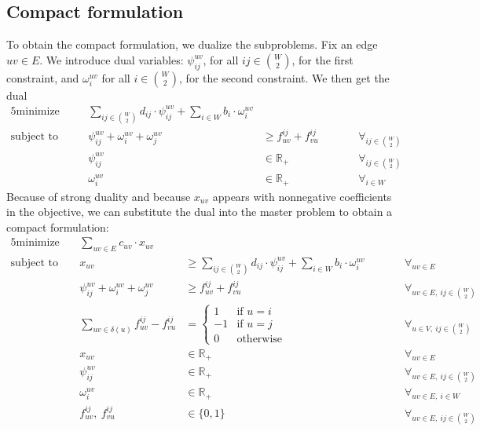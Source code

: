\documentclass[11pt]{article}
\begin{document}
    \subsection{Compact formulation}
    To obtain the compact formulation, we dualize the subproblems.
    Fix an edge $uv \in E$.
    We introduce dual variables: $\psi_{ij}^{uv}$, for all $ij \in \binom W 2$, for the first constraint, and $\omega_i^{uv}$ for all $i \in \binom W 2$, for the second constraint.
    We then get the dual
    \begin{alignat*}{5}
        \text{minimize}\quad && \sum_{ij \in \binom{W}{2}} d_{ij} \cdot \psi_{ij}^{uv} + \sum_{i \in W} b_i \cdot \omega_i^{uv} &&& \\
        \text{subject to}\quad && \psi_{ij}^{uv} + \omega_i^{uv} + \omega_j^{uv} &\ge f_{uv}^{ij} + f_{vu}^{ij} &&\qquad \forall_{ij \in \binom W 2} \\
        && \psi_{ij}^{uv} &\in \mathbb{R}_+ &&\qquad \forall_{ij \in \binom{W}{2}} \\
        && \omega_i^{uv} &\in \mathbb{R}_+ &&\qquad \forall_{i \in W}
    \end{alignat*}
    Because of strong duality and because $x_{uv}$ appears with nonnegative coefficients in the objective, we can substitute the dual into the master problem to obtain a compact formulation:
    \begin{alignat*}{5}
        \text{minimize}\ && \sum_{uv \in E} c_{uv} \cdot x_{uv} &&& \\
        \text{subject to}\ && x_{uv} &\ge \sum_{ij \in \binom{W}{2}} d_{ij} \cdot \psi_{ij}^{uv} + \sum_{i \in W} b_i \cdot \omega_i^{uv} &&\qquad \forall_{uv \in E} \\
        && \psi_{ij}^{uv} + \omega_i^{uv} + \omega_j^{uv} &\ge f_{uv}^{ij} + f_{vu}^{ij} &&\qquad \forall_{uv \in E,\ ij \in \binom W 2} \\
        && \sum_{uv \in \delta(u)} f_{uv}^{ij} - f_{vu}^{ij} &= \begin{cases}
                                     1 & \text{if $u = i$} \\
                                     -1 & \text{if $u = j$} \\
                                     0 & \text{otherwise}
        \end{cases} &&\qquad \forall_{u \in V,\ ij \in \binom{W}{2}} \\
        && x_{uv} &\in \mathbb{R}_+ &&\qquad \forall_{uv \in E} \\
        && \psi_{ij}^{uv} &\in \mathbb{R}_+ &&\qquad \forall_{uv \in E,\ ij \in \binom{W}{2}} \\
        && \omega_i^{uv} &\in \mathbb{R}_+ &&\qquad \forall_{uv \in E,\ i \in W} \\
        && f_{uv}^{ij},\ f_{vu}^{ij} &\in \{ 0, 1 \} &&\qquad \forall_{uv \in E,\ ij \in \binom{W}{2}}
    \end{alignat*}
\end{document}
